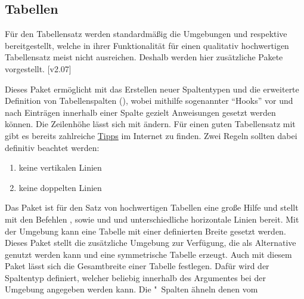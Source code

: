 \subsection{%
  Tabellen%
}
%
Für den Tabellensatz werden standardmäßig die Umgebungen  
und  respektive  bereitgestellt, 
welche in ihrer Funktionalität für einen qualitativ hochwertigen Tabellensatz 
meist nicht ausreichen. Deshalb werden hier zusätzliche Pakete vorgestellt.
[v2.07]

\begin{DeclarePackages}
  Dieses Paket ermöglicht mit  das Erstellen neuer 
  Spaltentypen und die erweiterte Definition von Tabellenspalten
  (\PValue{>\MPValue{\dots}}\PValue{<\MPValue{\dots}}), 
  wobei mithilfe sogenannter \enquote{Hooks} vor und nach Einträgen innerhalb 
  einer Spalte gezielt Anweisungen gesetzt werden können. Die Zeilenhöhe lässt 
  sich mit  ändern. 
  Für einen guten Tabellensatz mit  gibt es bereits zahlreiche 
  \href{http://userpage.fu-berlin.de/latex/Materialien/tabsatz.pdf}{Tipps} im 
  Internet zu finden. Zwei Regeln sollten dabei definitiv beachtet werden:
  \begin{enumerate}[itemindent=0pt,labelwidth=*,labelsep=1em,label=\Roman*.]
  \item keine vertikalen Linien
  \item keine doppelten Linien
  \end{enumerate}
  Das Paket  ist für den Satz von hochwertigen Tabellen eine 
  große Hilfe und stellt mit den Befehlen ,  
  sowie  und  und unterschiedliche horizontale 
  Linien bereit.
  Mit der Umgebung  kann eine Tabelle mit einer 
  definierten Breite gesetzt werden. Dieses Paket stellt die zusätzliche 
  Umgebung  zur Verfügung, die als Alternative genutzt 
  werden kann und eine symmetrische Tabelle erzeugt.
  Auch mit diesem Paket lässt sich die Gesamtbreite einer Tabelle festlegen. 
  Dafür wird der Spaltentyp  definiert, welcher beliebig innerhalb 
  des Argumentes  bei der Umgebung 
  angegeben werden kann. Die "~Spalten ähneln denen vom 

\end{DeclarePackages}
